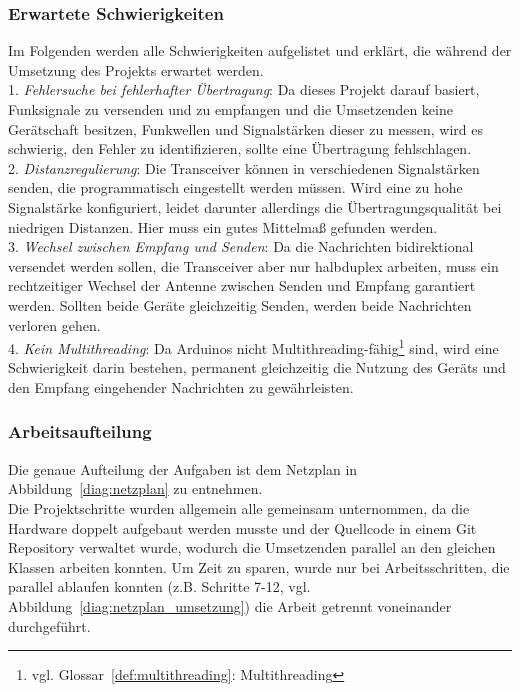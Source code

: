 \documentclass[a4paper, 11pt]{scrartcl}
\begin{document}
\subsubsection{Erwartete Schwierigkeiten}\label{ch:hard_stuff_expected}
Im Folgenden werden alle Schwierigkeiten aufgelistet und erklärt, die während der Umsetzung des Projekts erwartet werden.
\\
1. \textit{Fehlersuche bei fehlerhafter Übertragung}: Da dieses Projekt darauf basiert, Funksignale zu versenden und zu empfangen und die Umsetzenden keine Gerätschaft
besitzen, Funkwellen und Signalstärken dieser zu messen, wird es schwierig, den Fehler zu identifizieren, sollte eine Übertragung fehlschlagen.
\\
2. \textit{Distanzregulierung}: Die Transceiver können in verschiedenen Signalstärken senden, die programmatisch eingestellt werden müssen.
Wird eine zu hohe Signalstärke konfiguriert, leidet darunter allerdings die Übertragungsqualität bei niedrigen Distanzen. Hier muss ein gutes Mittelmaß
gefunden werden.
\\
3. \textit{Wechsel zwischen Empfang und Senden}: Da die Nachrichten bidirektional versendet werden sollen, die Transceiver aber nur halbduplex arbeiten,
muss ein rechtzeitiger Wechsel der Antenne zwischen Senden und Empfang garantiert werden. Sollten beide Geräte gleichzeitig Senden, werden beide Nachrichten
verloren gehen.
\\
4. \textit{Kein Multithreading}: Da Arduinos nicht Multithreading-fähig\footnote{vgl. Glossar~\ref{def:multithreading}: Multithreading} sind, wird eine Schwierigkeit
darin bestehen, permanent gleichzeitig die Nutzung des Geräts und den Empfang eingehender Nachrichten zu gewährleisten.\label{itm:thread}

\subsubsection{Arbeitsaufteilung}
Die genaue Aufteilung der Aufgaben ist dem Netzplan in Abbildung~\ref{diag:netzplan} zu entnehmen.
\\
Die Projektschritte wurden allgemein alle gemeinsam unternommen, da die Hardware doppelt aufgebaut werden musste und der Quellcode in einem Git Repository verwaltet wurde,
wodurch die Umsetzenden parallel an den gleichen Klassen arbeiten konnten. Um Zeit zu sparen, wurde nur bei Arbeitsschritten, die parallel ablaufen konnten (z.B. Schritte 7-12, vgl.
Abbildung~\ref{diag:netzplan_umsetzung}) die Arbeit getrennt voneinander durchgeführt.
\end{document}
